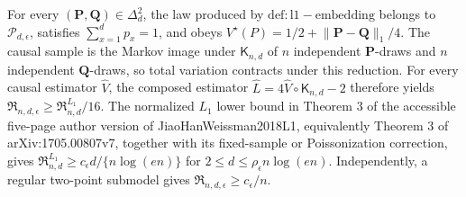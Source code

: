 For every \((\mathbf P,\mathbf Q)\in\Delta_d^2\), the law produced by \(\mathrm{def:l1-embedding}\) belongs to \(\mathcal P_{d,\epsilon}\), satisfies \(\sum_{x=1}^dp_x=1\), and obeys \(V^\star(P)=1/2+\lVert\mathbf P-\mathbf Q\rVert_1/4\). The causal sample is the Markov image under \(\mathsf K_{n,d}\) of \(n\) independent \(\mathbf P\)-draws and \(n\) independent \(\mathbf Q\)-draws, so total variation contracts under this reduction. For every causal estimator \(\widehat V\), the composed estimator \(\widehat L=4\widehat V\circ\mathsf K_{n,d}-2\) therefore yields \(\mathfrak R_{n,d,\epsilon}\ge\mathfrak R^{L_1}_{n,d}/16\). The normalized \(L_1\) lower bound in Theorem 3 of the accessible five-page author version of JiaoHanWeissman2018L1, equivalently Theorem 3 of arXiv:1705.00807v7, together with its fixed-sample or Poissonization correction, gives \(\mathfrak R^{L_1}_{n,d}\ge c_\epsilon d/\{n\log(en)\}\) for \(2\le d\le\rho_\epsilon n\log(en)\). Independently, a regular two-point submodel gives \(\mathfrak R_{n,d,\epsilon}\ge c_\epsilon/n\).